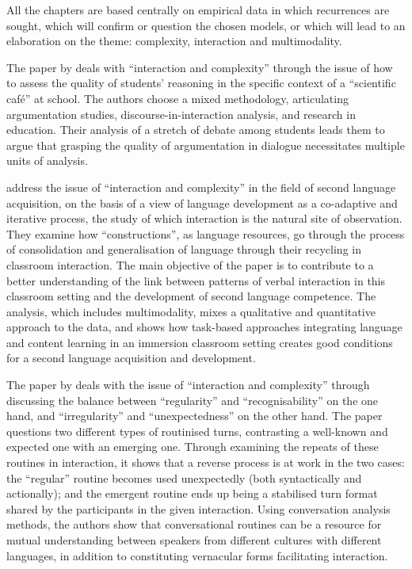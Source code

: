 \documentclass[output=paper]{langscibook}
\begin{document}
All the chapters are based centrally on empirical data in which recurrences are sought, which will confirm or question the chosen models, or which will lead to an elaboration on the theme: complexity, interaction and multimodality.

The paper by  deals with “interaction and complexity” through the issue of how to assess the quality of students' reasoning in the specific context of a “scientific  café” at school. The authors choose a mixed methodology, articulating argumentation studies, discourse-in-interaction analysis, and research in education. Their analysis of a stretch of debate among students leads them to argue that grasping the quality of argumentation in dialogue necessitates multiple units of analysis. 

 address the issue of “interaction and complexity” in the field of second language acquisition, on the basis of a view of language development as a co-adaptive and iterative process, the study of which interaction is the natural site of observation. They examine how “constructions”, as language resources, go through the process of consolidation and generalisation of language through their recycling in classroom interaction. The main objective of the paper is to contribute to a better understanding of the link between patterns of verbal interaction in this classroom setting and the development of second language competence. The analysis, which includes multimodality, mixes a qualitative and quantitative approach to the data, and shows how task-based approaches integrating language and content learning in an immersion classroom setting creates good conditions for a second language acquisition and development.

The paper by  deals with the issue of “interaction and complexity” through discussing the balance between “regularity” and “recognisability” on the one hand, and “irregularity” and “unexpectedness” on the other hand. The paper questions two different types of routinised turns, contrasting a well-known and expected one with an emerging one. Through examining the repeats of these routines in interaction, it shows that a reverse process is at work in the two cases: the “regular” routine becomes used unexpectedly (both syntactically and actionally); and the emergent routine ends up being a stabilised turn format shared by the participants in the given interaction. Using conversation analysis methods, the authors show that conversational routines can be a resource for mutual understanding between speakers from different cultures with different languages, in addition to constituting vernacular forms facilitating interaction. 
\end{document}

